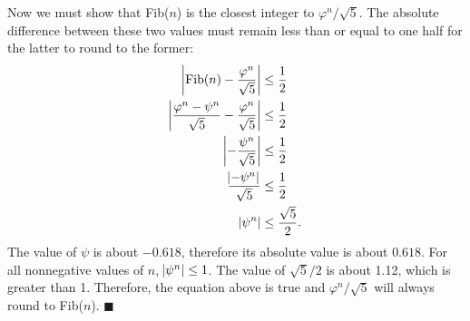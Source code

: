 \documentclass{article}
\begin{document}
Now we must show that Fib(\(n\)) is the closest integer to \(\varphi^n/\sqrt{5}\). The absolute difference between these two values must remain less than or equal to one half for the latter to round to the former:
\begin{align*}
\abs{\textup{Fib}(n)-\frac{\varphi^n}{\sqrt5}} &\le \frac12\\
\abs{\frac{\varphi^n-\psi^n}{\sqrt5} - \frac{\varphi^n}{\sqrt5}} &\le \frac12\\
\abs{-\frac{\psi^n}{\sqrt5}} &\le \frac12\\
\frac{\abs{-\psi^n}}{\sqrt5} &\le \frac12\\
\abs{\psi^n} &\le \frac{\sqrt5}{2}.
\end{align*}
The value of \(\psi\) is about \(-0.618\), therefore its absolute value is about \(0.618\). For all nonnegative values of \(n\), \(\abs{\psi^n}\le1\). The value of \(\sqrt5/2\) is about 1.12, which is greater than 1. Therefore, the equation above is true and  \(\varphi^n/\sqrt{5}\) will always round to Fib(\(n\)). \(\blacksquare\)
\end{document}
